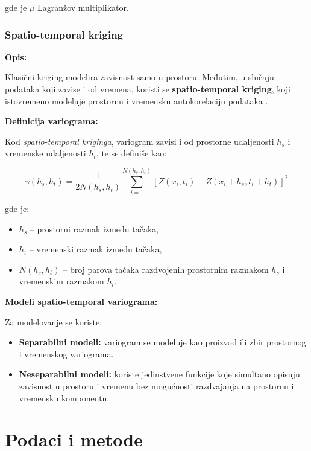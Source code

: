 \documentclass[12pt]{article}
\begin{document}
gde je $\mu$ Lagranžov multiplikator.

\subsubsection{Spatio-temporal kriging}

\textbf{Opis:}

Klasični kriging modelira zavisnost samo u prostoru. Međutim, u slučaju podataka koji zavise i od vremena, koristi se \textbf{spatio-temporal kriging}, koji istovremeno modeluje prostornu i vremensku autokorelaciju podataka \cite{gabriel1980spatio}.

\textbf{Definicija variograma:}

Kod \textit{spatio-temporal kriginga}, variogram zavisi i od prostorne udaljenosti $h_s$ i vremenske udaljenosti $h_t$, te se definiše kao:

\begin{equation}
\gamma(h_s,h_t) = \frac{1}{2N(h_s,h_t)} \sum_{i=1}^{N(h_s,h_t)} [Z(x_i,t_i) - Z(x_i + h_s, t_i + h_t)]^2
\end{equation}

gde je:
\begin{itemize}
    \item $h_s$ -- prostorni razmak između tačaka,
    \item $h_t$ -- vremenski razmak između tačaka,
    \item $N(h_s,h_t)$ -- broj parova tačaka razdvojenih prostornim razmakom $h_s$ i vremenskim razmakom $h_t$.
\end{itemize}

\textbf{Modeli spatio-temporal variograma:}

Za modelovanje se koriste:

\begin{itemize}
    \item \textbf{Separabilni modeli:} variogram se modeluje kao proizvod ili zbir prostornog i vremenskog variograma.

    \item \textbf{Neseparabilni modeli:} koriste jedinstvene funkcije koje simultano opisuju zavisnost u prostoru i vremenu bez mogućnosti razdvajanja na prostornu i vremensku komponentu.
\end{itemize}



\newpage
\section{Podaci i metode}
\end{document}
